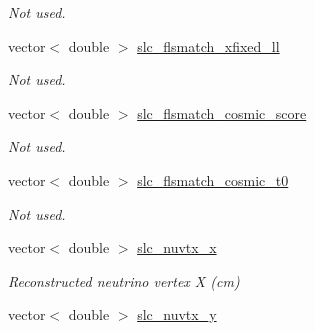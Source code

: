 \begin{DoxyCompactItemize}
\begin{DoxyCompactList}\small\item\em Not used. \end{DoxyCompactList}\item 
\hypertarget{classUBXSecEvent_a1bf76c945234f61391ad4d287862f2a8}{vector$<$ double $>$ \hyperlink{classUBXSecEvent_a1bf76c945234f61391ad4d287862f2a8}{slc\-\_\-flsmatch\-\_\-xfixed\-\_\-ll}}\label{classUBXSecEvent_a1bf76c945234f61391ad4d287862f2a8}

\begin{DoxyCompactList}\small\item\em Not used. \end{DoxyCompactList}\item 
\hypertarget{classUBXSecEvent_ad74c03fcc0b57d4084eb05d0f5617b3a}{vector$<$ double $>$ \hyperlink{classUBXSecEvent_ad74c03fcc0b57d4084eb05d0f5617b3a}{slc\-\_\-flsmatch\-\_\-cosmic\-\_\-score}}\label{classUBXSecEvent_ad74c03fcc0b57d4084eb05d0f5617b3a}

\begin{DoxyCompactList}\small\item\em Not used. \end{DoxyCompactList}\item 
\hypertarget{classUBXSecEvent_a645973d4e447d46008828658b826e8f0}{vector$<$ double $>$ \hyperlink{classUBXSecEvent_a645973d4e447d46008828658b826e8f0}{slc\-\_\-flsmatch\-\_\-cosmic\-\_\-t0}}\label{classUBXSecEvent_a645973d4e447d46008828658b826e8f0}

\begin{DoxyCompactList}\small\item\em Not used. \end{DoxyCompactList}\item 
\hypertarget{classUBXSecEvent_ac97e86f7559ceb52bacb97bd60c25f09}{vector$<$ double $>$ \hyperlink{classUBXSecEvent_ac97e86f7559ceb52bacb97bd60c25f09}{slc\-\_\-nuvtx\-\_\-x}}\label{classUBXSecEvent_ac97e86f7559ceb52bacb97bd60c25f09}

\begin{DoxyCompactList}\small\item\em Reconstructed neutrino vertex X (cm) \end{DoxyCompactList}\item 
\hypertarget{classUBXSecEvent_aabba0cbb738793a9713deb8888d3919b}{vector$<$ double $>$ \hyperlink{classUBXSecEvent_aabba0cbb738793a9713deb8888d3919b}{slc\-\_\-nuvtx\-\_\-y}}\label{classUBXSecEvent_aabba0cbb738793a9713deb8888d3919b}


\end{DoxyCompactItemize}
